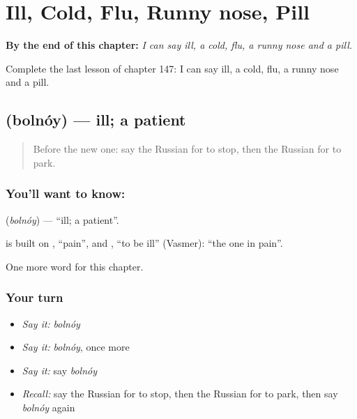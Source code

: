 
\chapter{Ill, Cold, Flu, Runny nose, Pill}
\label{ch:ru-ill-cold-flu-runny-nose-pill}

\begin{chapteropening}
\textbf{By the end of this chapter:} \emph{I can say ill, a cold, flu, a runny nose and a pill.}

Complete the last lesson of chapter 147: I can say ill, a cold, flu, a runny nose and a pill.
\end{chapteropening}

\section[\texorpdfstring{\ru{больной} (bolnóy)}{больной (bolnóy)}]{ (bolnóy) — ill; a patient}

\label{lesson:RU-C147-bolnoy}



\begin{quote}
Before the new one: say the Russian for to stop, then the Russian for to park.
\end{quote}

\subsection*{You'll want to know: }
\textbf{} (\emph{bolnóy}) — \textquotedblleft{}ill; a patient\textquotedblright{}.

\begin{cousinweb}
\textbf{} is built on \emph{}, \textquotedblleft{}pain\textquotedblright{}, and \emph{}, \textquotedblleft{}to be ill\textquotedblright{} (Vasmer): \textquotedblleft{}the one in pain\textquotedblright{}.
\end{cousinweb}

\begin{grammarlens}[title={What you've built}]
One more word for this chapter.
\end{grammarlens}

\subsection*{Your turn}
\begin{itemize}
\raggedright
  \item \emph{Say it:} \emph{bolnóy}
  \item \emph{Say it:} \emph{bolnóy}, once more
  \item \emph{Say it:} say \emph{bolnóy}
  \item \emph{Recall:} say the Russian for to stop, then the Russian for to park, then say \emph{bolnóy} again
\end{itemize}

